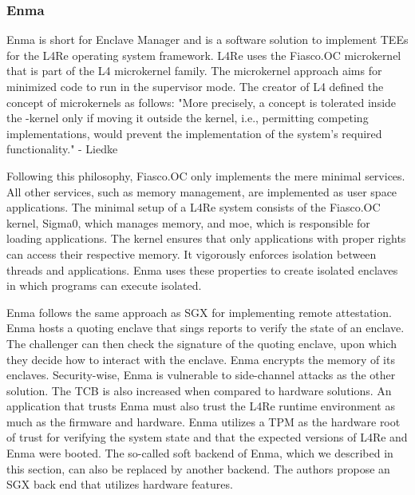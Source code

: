 \subsubsection{Enma}
\label{sec:20:enma}
Enma is short for Enclave Manager and is a software solution to implement TEEs for the L4Re operating system framework.
\cite{reitz_isolierende_2019}
L4Re uses the Fiasco.OC microkernel that is part of the L4 microkernel family. The microkernel approach aims for
minimized code to run in the supervisor mode. The creator of L4 defined the concept of microkernels as follows:
"More precisely, a concept is tolerated inside the \mu-kernel only if moving it outside the kernel, i.e., permitting
competing implementations, would prevent the implementation of the system's required functionality."
- Liedke\cite{liedtke1995micro}

Following this philosophy, Fiasco.OC only implements the mere minimal services. All other services, such as memory
management, are implemented as user space applications. The minimal setup of a L4Re system consists of the Fiasco.OC
kernel, Sigma0, which manages memory, and moe, which is responsible for loading applications. The kernel ensures that only
applications with proper rights can access their respective memory. It vigorously enforces isolation between threads and
applications. Enma uses these properties to create isolated enclaves in which programs can execute isolated.

Enma follows the same approach as SGX for implementing remote attestation. Enma
hosts a quoting enclave that sings reports to verify the state of an enclave. The challenger can then check the
signature of the quoting enclave, upon which they decide how to interact with the enclave. Enma encrypts the memory of
its enclaves. Security-wise, Enma is vulnerable to side-channel attacks as the other solution. The TCB is also increased
when compared to hardware solutions. An application that trusts Enma must also trust the L4Re runtime environment as
much as the firmware and hardware. Enma utilizes a TPM as the hardware root of trust for verifying the system state and
that the expected versions of L4Re and Enma were booted. The so-called soft backend of Enma, which we described in this
section, can also be replaced by another backend. The authors propose an SGX back end that utilizes hardware features.

